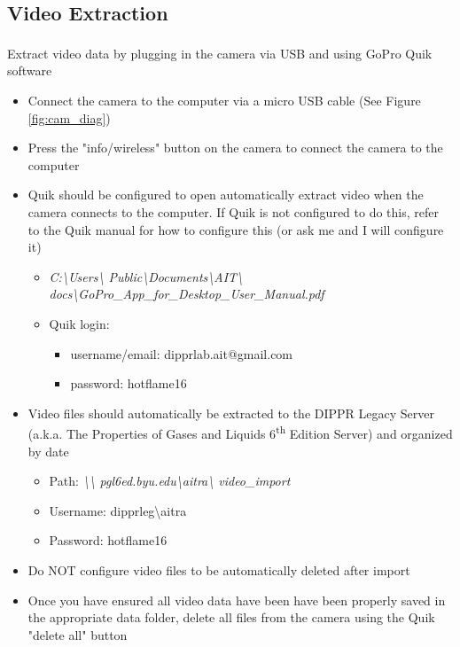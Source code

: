 \documentclass[letterpaper,11pt]{article}
\begin{document}
\subsection{Video Extraction} 
Extract video data by plugging in the camera via USB and using 
GoPro\textsuperscript{\textcopyright} Quik software
    \begin{itemize}
    \item Connect the camera to the computer via a micro USB cable (See 
        Figure \ref{fig:cam_diag})
    \item Press the "info/wireless" button on the camera to connect the 
        camera to the computer
    \item Quik should be configured to open automatically extract video 
        when the camera connects to the computer. If Quik is not configured 
        to do this, refer to the Quik manual for how to configure this 
        (or ask me and I will configure it)
        \begin{itemize}
        \item \textit{C:\textbackslash Users\textbackslash 
            Public\textbackslash Documents\textbackslash AIT\textbackslash 
            docs\textbackslash GoPro\_App\_for\_Desktop\_User\_Manual.pdf}
        \item Quik login:
            \begin{itemize}
            \item username/email: dipprlab.ait@gmail.com
            \item password: hotflame16
            \end{itemize}
        \end{itemize}
    \item Video files should automatically be extracted to the DIPPR  
        Legacy Server (a.k.a. The Properties of Gases and Liquids  
        6\textsuperscript{th} Edition Server) and organized by date
        \begin{itemize}
        \item Path: \textit{\textbackslash \textbackslash 
           pgl6ed.byu.edu\textbackslash aitra\textbackslash 
           video\_import}
        \item Username: dipprleg\textbackslash aitra
        \item Password: hotflame16
        \end{itemize}
    \item Do NOT configure video files to be automatically deleted after 
        import
    \item Once you have ensured all video data have been have been properly
        saved in the appropriate data folder, delete all files from the 
        camera using the Quik "delete all" button
    \end{itemize}
\end{document}
